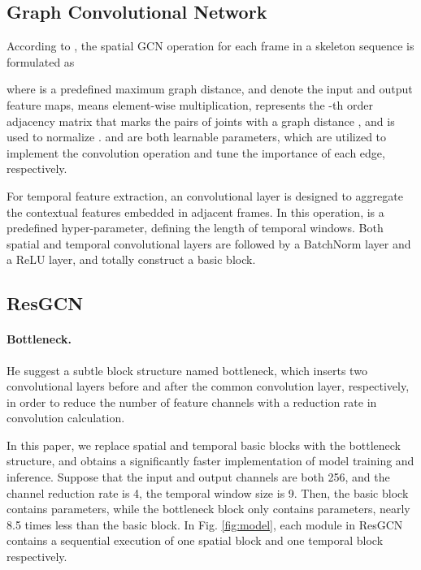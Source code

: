 \documentclass[sigconf]{acmart}
\begin{document}
\subsection{Graph Convolutional Network}
\label{ssec:gcn}

According to \cite{yan2018spatial}, the spatial GCN operation for each frame  in a skeleton sequence is formulated as

where  is a predefined maximum graph distance,  and  denote the input and output feature maps,  means element-wise multiplication,  represents the -th order adjacency matrix that marks the pairs of joints with a graph distance , and  is used to normalize .  and  are both learnable parameters, which are utilized to implement the convolution operation and tune the importance of each edge, respectively.

For temporal feature extraction, an  convolutional layer is designed to aggregate the contextual features embedded in adjacent frames. In this operation,  is a predefined hyper-parameter, defining the length of temporal windows. Both spatial and temporal convolutional layers are followed by a BatchNorm layer and a ReLU layer, and totally construct a basic block.

\subsection{ResGCN}
\label{ssec:details}

\paragraph{Bottleneck.} He \etal \cite{he2016deep} suggest a subtle block structure named bottleneck, which inserts two  convolutional layers before and after the common convolution layer, respectively, in order to reduce the number of feature channels with a reduction rate  in convolution calculation.

In this paper, we replace spatial and temporal basic blocks with the bottleneck structure, and obtains a significantly faster implementation of model training and inference. Suppose that the input and output channels are both 256, and the channel reduction rate  is 4, the temporal window size  is 9. Then, the basic block contains  parameters, while the bottleneck block only contains  parameters, nearly 8.5 times less than the basic block. In Fig. \ref{fig:model}, each module in ResGCN contains a sequential execution of one spatial block and one temporal block respectively.
\end{document}
